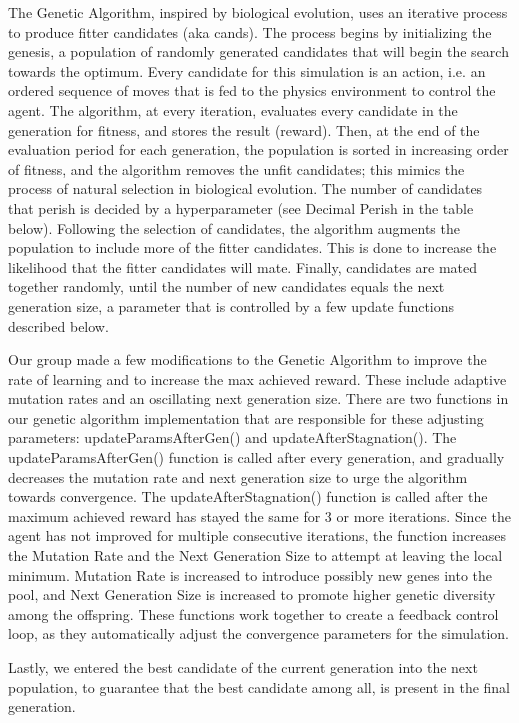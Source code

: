 \documentclass{article}
\begin{document}
The Genetic Algorithm, inspired by biological evolution, uses an iterative process to produce fitter candidates (aka cands). The process begins by initializing the genesis, a population of randomly generated candidates that will begin the search towards the optimum. Every candidate for this simulation is an action, i.e. an ordered sequence of moves that is fed to the physics environment to control the agent. The algorithm, at every iteration, evaluates every candidate in the generation for fitness, and stores the result (reward). Then, at the end of the evaluation period for each generation, the population is sorted in increasing order of fitness, and the algorithm removes the unfit candidates; this mimics the process of natural selection in biological evolution. The number of candidates that perish is decided by a hyperparameter (see Decimal Perish in the table below). Following the selection of candidates, the algorithm augments the population to include more of the fitter candidates. This is done to increase the likelihood that the fitter candidates will mate. Finally, candidates are mated together randomly, until the number of new candidates equals the next generation size, a parameter that is controlled by a few update functions described below.

Our group made a few modifications to the Genetic Algorithm to improve the rate of learning and to increase the max achieved reward. These include adaptive mutation rates and an oscillating next generation size. There are two functions in our genetic algorithm implementation that are responsible for these adjusting parameters: updateParamsAfterGen() and updateAfterStagnation(). The updateParamsAfterGen() function is called after every generation, and gradually decreases the mutation rate and next generation size to urge the algorithm towards convergence. The updateAfterStagnation() function is called after the maximum achieved reward has stayed the same for 3 or more iterations. Since the agent has not improved for multiple consecutive iterations, the function increases the Mutation Rate and the Next Generation Size to attempt at leaving the local minimum. Mutation Rate is increased to introduce possibly new genes into the pool, and Next Generation Size is increased to promote higher genetic diversity among the offspring. These functions work together to create a feedback control loop, as they automatically adjust the convergence parameters for the simulation.

Lastly, we entered the best candidate of the current generation into the next population, to guarantee that the best candidate among all, is present in the final generation.
\end{document}
